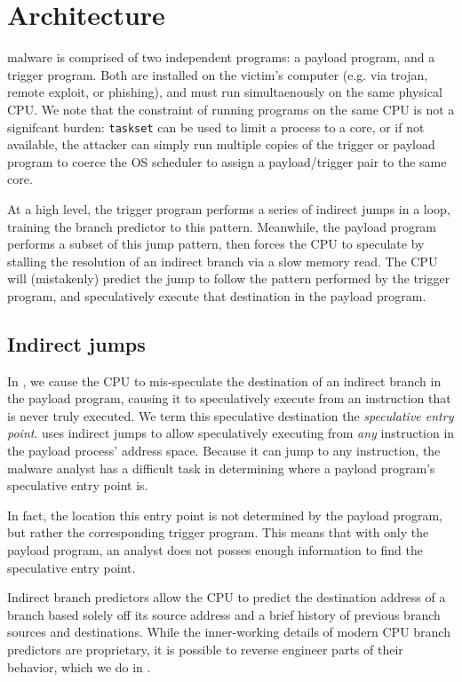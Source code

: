 

\section{Architecture}


\speculake malware is comprised of two independent programs: a payload program, and a
trigger program. Both are installed on the victim's computer (e.g. via trojan, remote
exploit, or phishing), and must run simultaenously on the same physical CPU. We
note that the constraint of running programs on the same CPU is not a signifcant
burden: \texttt{taskset} can be used to limit a process to a core, or if not
available, the attacker can simply run multiple copies of the trigger or payload
program to coerce the OS scheduler to assign a payload/trigger pair to the same
core.

At a high level, the trigger program performs a series of indirect jumps in a
loop, training the branch predictor to this pattern. Meanwhile, the
payload program performs a subset of this jump pattern, then forces the CPU to
speculate by stalling the resolution of an indirect branch via a slow memory
read. The CPU will (mistakenly) predict the jump to follow the pattern performed
by the trigger program, and speculatively execute that destination in the
payload program.

\subsection{Indirect jumps}


In \speculake, we cause the CPU to mis-speculate the destination of an indirect
branch in the payload program, causing it to speculatively execute from an
instruction that is never truly executed. We term this speculative destination the
\emph{speculative entry point}.
\speculake uses indirect jumps to allow speculatively executing from \emph{any}
instruction in the payload process' address space. Because it can jump to any
instruction, the malware analyst has a difficult task in determining where a
payload program's speculative entry point is.

In fact, the location this entry point is not determined by the payload
program, but rather the corresponding trigger program. This means that with only
the payload program, an analyst does not posses enough information to find the
speculative entry point.



Indirect branch predictors allow the CPU to predict the destination address of a
branch based solely off its source address and a brief history of previous
branch sources and destinations. While the inner-working details of modern CPU
branch predictors are proprietary, it is possible to reverse engineer parts of
their behavior, which we do in \speculake.

